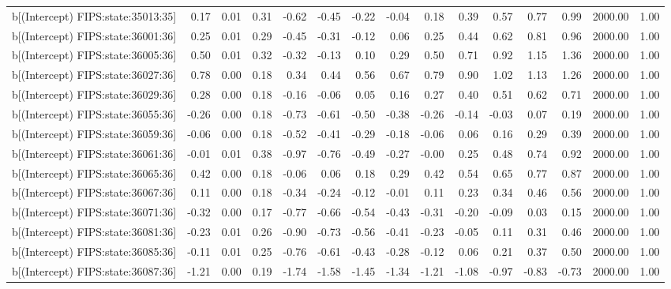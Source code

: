 \begin{table}[ht]
\begin{tabular}{rrrrrrrrrrrrrrr}
  b[(Intercept) FIPS:state:35013:35] & 0.17 & 0.01 & 0.31 & -0.62 & -0.45 & -0.22 & -0.04 & 0.18 & 0.39 & 0.57 & 0.77 & 0.99 & 2000.00 & 1.00 \\ 
  b[(Intercept) FIPS:state:36001:36] & 0.25 & 0.01 & 0.29 & -0.45 & -0.31 & -0.12 & 0.06 & 0.25 & 0.44 & 0.62 & 0.81 & 0.96 & 2000.00 & 1.00 \\ 
  b[(Intercept) FIPS:state:36005:36] & 0.50 & 0.01 & 0.32 & -0.32 & -0.13 & 0.10 & 0.29 & 0.50 & 0.71 & 0.92 & 1.15 & 1.36 & 2000.00 & 1.00 \\ 
  b[(Intercept) FIPS:state:36027:36] & 0.78 & 0.00 & 0.18 & 0.34 & 0.44 & 0.56 & 0.67 & 0.79 & 0.90 & 1.02 & 1.13 & 1.26 & 2000.00 & 1.00 \\ 
  b[(Intercept) FIPS:state:36029:36] & 0.28 & 0.00 & 0.18 & -0.16 & -0.06 & 0.05 & 0.16 & 0.27 & 0.40 & 0.51 & 0.62 & 0.71 & 2000.00 & 1.00 \\ 
  b[(Intercept) FIPS:state:36055:36] & -0.26 & 0.00 & 0.18 & -0.73 & -0.61 & -0.50 & -0.38 & -0.26 & -0.14 & -0.03 & 0.07 & 0.19 & 2000.00 & 1.00 \\ 
  b[(Intercept) FIPS:state:36059:36] & -0.06 & 0.00 & 0.18 & -0.52 & -0.41 & -0.29 & -0.18 & -0.06 & 0.06 & 0.16 & 0.29 & 0.39 & 2000.00 & 1.00 \\ 
  b[(Intercept) FIPS:state:36061:36] & -0.01 & 0.01 & 0.38 & -0.97 & -0.76 & -0.49 & -0.27 & -0.00 & 0.25 & 0.48 & 0.74 & 0.92 & 2000.00 & 1.00 \\ 
  b[(Intercept) FIPS:state:36065:36] & 0.42 & 0.00 & 0.18 & -0.06 & 0.06 & 0.18 & 0.29 & 0.42 & 0.54 & 0.65 & 0.77 & 0.87 & 2000.00 & 1.00 \\ 
  b[(Intercept) FIPS:state:36067:36] & 0.11 & 0.00 & 0.18 & -0.34 & -0.24 & -0.12 & -0.01 & 0.11 & 0.23 & 0.34 & 0.46 & 0.56 & 2000.00 & 1.00 \\ 
  b[(Intercept) FIPS:state:36071:36] & -0.32 & 0.00 & 0.17 & -0.77 & -0.66 & -0.54 & -0.43 & -0.31 & -0.20 & -0.09 & 0.03 & 0.15 & 2000.00 & 1.00 \\ 
  b[(Intercept) FIPS:state:36081:36] & -0.23 & 0.01 & 0.26 & -0.90 & -0.73 & -0.56 & -0.41 & -0.23 & -0.05 & 0.11 & 0.31 & 0.46 & 2000.00 & 1.00 \\ 
  b[(Intercept) FIPS:state:36085:36] & -0.11 & 0.01 & 0.25 & -0.76 & -0.61 & -0.43 & -0.28 & -0.12 & 0.06 & 0.21 & 0.37 & 0.50 & 2000.00 & 1.00 \\ 
  b[(Intercept) FIPS:state:36087:36] & -1.21 & 0.00 & 0.19 & -1.74 & -1.58 & -1.45 & -1.34 & -1.21 & -1.08 & -0.97 & -0.83 & -0.73 & 2000.00 & 1.00 \\ 

\end{tabular}
\end{table}
